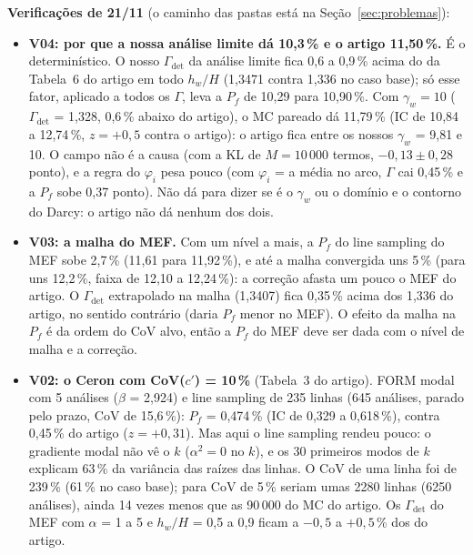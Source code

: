 \documentclass[11pt,a4paper]{article}
\begin{document}
\textbf{Verificações de 21/11} (o caminho das pastas está na Seção~\ref{sec:problemas}):
\begin{itemize}
  \item \textbf{V04: por que a nossa análise limite dá 10,3\,\% e o artigo 11,50\,\%.} É o determinístico. O nosso
    $\Gamma_\text{det}$ da análise limite fica 0,6 a 0,9\,\% acima do da Tabela~6 do artigo em todo $h_w/H$ (1,3471
    contra 1,336 no caso base); só esse fator, aplicado a todos os $\Gamma$, leva a $P_f$ de 10,29 para 10,90\,\%. Com
    $\gamma_w = 10$ ($\Gamma_\text{det}$ = 1,328, 0,6\,\% abaixo do artigo), o MC pareado dá 11,79\,\% (IC de 10,84 a
    12,74\,\%, $z = +0{,}5$ contra o artigo): o artigo fica entre os nossos $\gamma_w$ = 9,81 e 10. O campo não é a
    causa (com a KL de $M = 10\,000$ termos, $-0{,}13 \pm 0{,}28$ ponto), e a regra do $\varphi_i$ pesa pouco (com
    $\varphi_i$ = a média no arco, $\Gamma$ cai 0,45\,\% e a $P_f$ sobe 0,37 ponto). Não dá para dizer se é o $\gamma_w$
    ou o domínio e o contorno do Darcy: o artigo não dá nenhum dos dois.
  \item \textbf{V03: a malha do MEF.} Com um nível a mais, a $P_f$ do line sampling do MEF sobe 2,7\,\% (11,61 para
    11,92\,\%), e até a malha convergida uns 5\,\% (para uns 12,2\,\%, faixa de 12,10 a 12,24\,\%): a correção afasta um
    pouco o MEF do artigo. O $\Gamma_\text{det}$ extrapolado na malha (1,3407) fica 0,35\,\% acima dos 1,336 do artigo,
    no sentido contrário (daria $P_f$ menor no MEF). O efeito da malha na $P_f$ é da ordem do CoV alvo, então a $P_f$ do
    MEF deve ser dada com o nível de malha e a correção.
  \item \textbf{V02: o Ceron com CoV($c'$) = 10\,\%} (Tabela~3 do artigo). FORM modal com 5 análises ($\beta$ = 2,924) e
    line sampling de 235 linhas (645 análises, parado pelo prazo, CoV de 15,6\,\%): $P_f$ = 0,474\,\% (IC de 0,329 a
    0,618\,\%), contra 0,45\,\% do artigo ($z = +0{,}31$). Mas aqui o line sampling rendeu pouco: o gradiente modal não vê
    o $k$ ($\alpha^2 = 0$ no $k$), e os 30 primeiros modos de $k$ explicam 63\,\% da variância das raízes das linhas. O
    CoV de uma linha foi de 239\,\% (61\,\% no caso base); para CoV de 5\,\% seriam umas 2280 linhas (6250 análises),
    ainda 14 vezes menos que as 90\,000 do MC do artigo. Os $\Gamma_\text{det}$ do MEF com $\alpha$ = 1 a 5 e
    $h_w/H$ = 0,5 a 0,9 ficam a $-0{,}5$ a $+0{,}5$\,\% dos do artigo.
\end{itemize}
\end{document}
